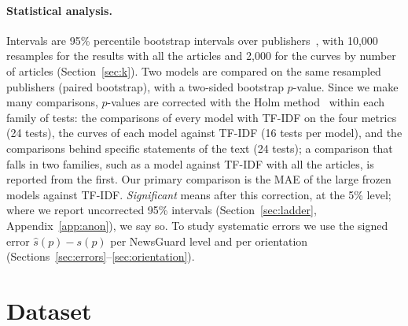 \documentclass[11pt,a4paper]{article}
\begin{document}
\paragraph{Statistical analysis.}
Intervals are 95\% percentile bootstrap intervals over publishers~\cite{efron1979bootstrap}, with 10,000 resamples for
the results with all the articles and 2,000 for the curves by number of articles (Section~\ref{sec:k}). Two models are
compared on the same resampled publishers (paired bootstrap), with a two-sided bootstrap $p$-value. Since we make many
comparisons, $p$-values are corrected with the Holm method~\cite{holm1979simple} within each family of tests: the
comparisons of every model with TF-IDF on the four metrics (24 tests), the curves of each model against TF-IDF (16
tests per model), and the comparisons behind specific statements of the text (24 tests); a comparison that falls in two
families, such as a model against TF-IDF with all the articles, is reported from the first. Our primary comparison is
the MAE of the large frozen models against TF-IDF. \emph{Significant} means after this correction, at the 5\% level;
where we report uncorrected 95\% intervals (Section~\ref{sec:ladder}, Appendix~\ref{app:anon}), we say so. To study systematic errors we use the signed error $\hat{s}(p) - s(p)$ per
NewsGuard level and per orientation (Sections~\ref{sec:errors}--\ref{sec:orientation}).

\section{Dataset}\label{sec:data}
\end{document}
